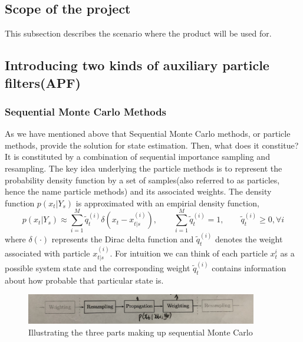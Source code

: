 \documentclass[11pt,oneside,a4paper]{article}
\begin{document}
\subsection{Scope of the project}
This subsection describes the scenario where the product will be used for.

\subsection{Introducing two kinds of auxiliary particle filters(APF)}
\subsubsection{Sequential Monte Carlo Methods}
As we have mentioned above that Sequential Monte Carlo methods, or particle methods, provide the solution for state estimation. Then, what does it
constitue? It is constituted by a combination of sequential importance sampling and resampling. The key idea underlying the particle methods is to represent
the probability density function by a set of samples(also referred to as particles, hence the name particle methods) and its associated weights.
The density function $p(x_{t}|Y_s) $ is approximated with an empirial density function,
\begin{equation}
p(x_{t}|Y_s) \approx \sum_{i=1}^M\tilde{q}_t^{(i)}\delta(x_t - x_{t|s}^{(i)}), \qquad \sum_{i=1}^{M}\tilde{q}_{t}^{(i)} = 1, \qquad \tilde{q}_{t}^{(i)} \geq 0, \forall{i}
\end{equation}
where $\delta(\cdot) $ represents the Dirac delta function and $\tilde{q}_{t}^{(i)} $ denotes the weight associated with particle $x_{t|s}^{(i)} $. For intuition we can think of each
particle $x_{t}^{i} $ as a possible system state and the corresponding weight $\tilde{q}_{t}^{(i)} $ contains information about how probable that particular state is.
\begin{figure}[H]
  \begin{center}
  \includegraphics[width=0.9\textwidth]{./source/PF/5.JPG}
  \caption{Illustrating the three parts making up sequential Monte Carlo}
  \label{}
  \end{center}
\end{figure}
\end{document}

